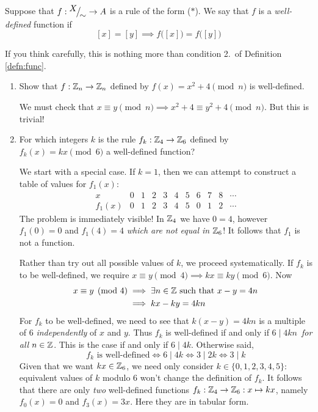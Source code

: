 \begin{defn}{}{}
	Suppose that $f:{}^{\textstyle {X}}\!\big/_{\textstyle \!{\sim}}\to A$ is a rule of the form ($\ast$). We say that $f$ is a \emph{well-defined} function if
	\[
		[x]=[y]\implies f\bigl([x]\bigr)=f\bigl([y]\bigr)
	\]
\end{defn}

If you think carefully, this is nothing more than condition 2.\ of Definition \ref{defn:func}.

\begin{examples}{}{}
\begin{enumerate}
	\item Show that $f:\mathbb{Z}_n\to\mathbb{Z}_n$ defined by $f(x)=x^2+4\pmod n$ is well-defined.\par
	We must check that $x\equiv y\pmod n\implies x^2+4\equiv y^2+4\pmod n$. But this is trivial!
	\item For which integers $k$ is the rule $f_k:\mathbb{Z}_4\to\mathbb{Z}_6$ defined by $f_k(x)=kx\pmod 6$ a well-defined function?\par
	We start with a special case. If $k=1$, then we can attempt to construct a table of values for $f_1(x)$:
	\[
		\begin{array}{c|cccc|cccc|cc}
			x&0&1&2&3&4&5&6&7&8&\cdots\\\hline
			f_1(x)&0&1&2&3&4&5&0&1&2&\cdots
		\end{array}
	\]
	The problem is immediately visible! In $\mathbb{Z}_4$ we have $0=4$, however $f_1(0)=0$ and $f_1(4)=4$ \emph{which are not equal in $\mathbb{Z}_6$}! It follows that $f_1$ is not a function.\par
	Rather than try out all possible values of $k$, we proceed systematically. If $f_k$ is to be well-defined, we require $x\equiv y\pmod 4\implies kx\equiv ky\pmod 6$. Now
	\begin{align*}
		x\equiv y\pmod 4&\implies \exists n\in\mathbb{Z}\text{ such that }x-y=4n\\*
		&\implies kx-ky=4kn
	\end{align*}
	For $f_k$ to be well-defined, we need to see that $k(x-y)=4kn$ is a multiple of 6 \emph{independently} of $x$ and $y$. Thus $f_k$ is well-defined if and only if $6\mid 4kn$\, \emph{for all} $n\in\mathbb{Z}$. This is the case if and only if $6\mid 4k$. Otherwise said,
	\[
		\text{$f_k$ is well-defined}\iff 6\mid 4k\iff 3\mid 2k\iff 3\mid k
	\]
	Given that we want $kx\in\mathbb{Z}_6$, we need only consider $k\in\{0,1,2,3,4,5\}$: equivalent values of $k$ modulo 6 won't change the definition of $f_k$. It follows that there are only \emph{two} well-defined functions $f_k:\mathbb{Z}_4\to\mathbb{Z}_6:x\mapsto kx$, namely $f_0(x)=0$ and $f_3(x)=3x$. Here they are in tabular form.

\end{enumerate}
\end{examples}
